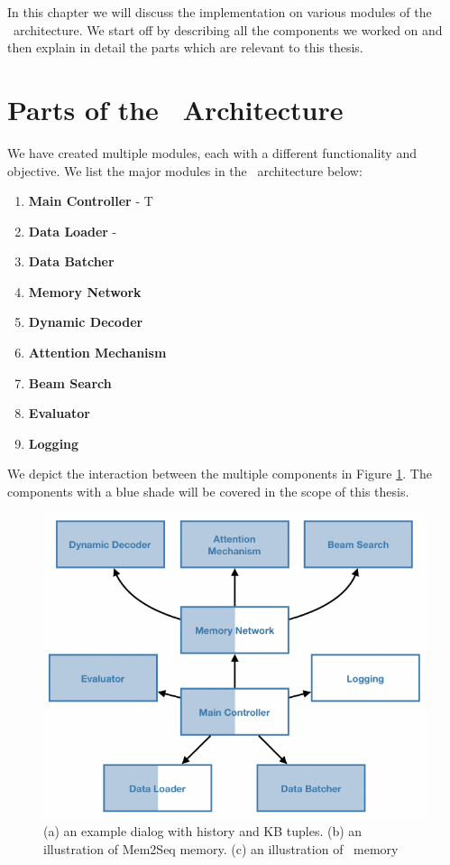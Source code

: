 In this chapter we will discuss the implementation on various modules of the \sys\ architecture. We start off by describing all the components we worked on and then explain in detail the parts which are relevant to this thesis.

\section{Parts of the \sys\ Architecture}

We have created multiple modules, each with a different functionality and objective. We list the major modules in the \sys\ architecture below:

\begin{enumerate}
	\item \textbf{Main Controller} - T
	\item \textbf{Data Loader} - 
	\item \textbf{Data Batcher}
	\item \textbf{Memory Network}
	\item \textbf{Dynamic Decoder}
	\item \textbf{Attention Mechanism}
	\item \textbf{Beam Search}
	\item \textbf{Evaluator}
	\item \textbf{Logging}
\end{enumerate}

We depict the interaction between the multiple components in Figure \ref{fig:sys_comp}. The components with a blue shade will be covered in the scope of this thesis.

\begin{figure}[!ht]
\centering
\includegraphics[scale=1.0]{assets/figures/components_orig.pdf}
\caption{(a) an example dialog with history and KB tuples. (b) an illustration of Mem2Seq memory. (c) an illustration of \sys\ memory}
\label{fig:sys_comp}
\end{figure}

